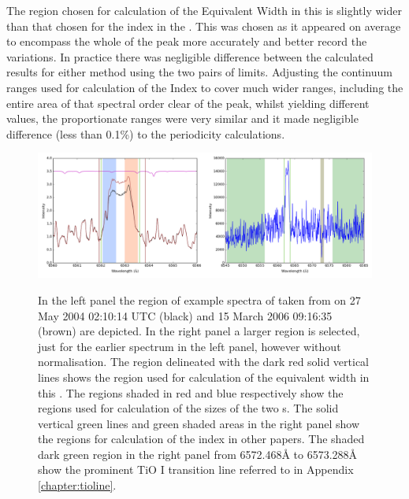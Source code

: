 The region chosen for calculation of the {\ha} Equivalent Width in this {\paperorthesis} is slightly wider than that
chosen for the {\ha} index in the \citet{suarezmascareno15}. This was chosen as it appeared on average to encompass the
whole of the {\ha} peak more accurately and better record the variations. In practice there was negligible difference
between the calculated results for either method using the two pairs of limits. Adjusting the continuum ranges used for
calculation of the {\ha} Index to cover much wider ranges, including the entire area of that spectral order clear of the
{\ha} peak, whilst yielding different values, the proportionate ranges were very similar and it made negligible
difference (less than 0.1\%) to the periodicity calculations.

\begin{figure}[!htbp]
\begin{center}
\includegraphics[scale=0.25]{Figures/harpsfirstha4.png} \\
\end{center}   
\caption{In the left panel the {\ha} region of example spectra of {\prox} taken from {\harps} on 27 May 2004 02:10:14
  UTC (black) and 15 March 2006 09:16:35 (brown) are depicted. In the right panel a larger region is selected, just for
  the earlier spectrum in the left panel, however without normalisation. The region delineated with the dark red solid
  vertical lines shows the region used for calculation of the {\ha} equivalent width in this \paperorthesis. The regions
  shaded in red and blue respectively show the regions used for calculation of the sizes of the two \horn s. The solid
  vertical green lines and green shaded areas in the right panel show the regions for calculation of the {\ha} index in
  other papers. The shaded dark green region in the right panel from 6572.468{\AA} to 6573.288{\AA} show the prominent
  TiO I transition line referred to in Appendix \ref{chapter:tioline}.
}
 \protect\label{fig:harpsfirstha}
\end{figure}

